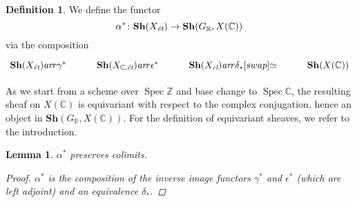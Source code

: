 \documentclass[leqno,12pt]{article}
\theoremstyle{plain}
\newtheorem{lemma}[theorem]{\indent\sc Lemma}
\theoremstyle{definition}
\newtheorem{definition}[theorem]{\indent\sc Definition}
\DeclareMathOperator{\Spec}{Spec}
\newcommand{\CC}{\mathbb{C}}
\newcommand{\RR}{\mathbb{R}}
\newcommand{\ZZ}{\mathbb{Z}}
\newcommand{\ar}{\text{\it ar}}
\newcommand{\et}{\text{\it \'{e}t}}
\begin{document}
\begin{definition}
  We define the functor
  $$\alpha^*\colon \mathbf{Sh} (X_\et) \to \mathbf{Sh} (G_\RR, X (\CC))$$
  via the composition
  \[ \begin{tikzcd}
      \mathbf{Sh} (X_\et) \ar{r}{\gamma^*} &
      \mathbf{Sh} (X_{\CC,\text{\it \'{e}t}}) \ar{r}{\epsilon^*} &
      \mathbf{Sh} (X_\text{\it cl}) \ar{r}{\delta_*}[swap]{\simeq} &
      \mathbf{Sh} (X (\CC))
    \end{tikzcd} \]
\end{definition}

As we start from a scheme over $\Spec \ZZ$ and base change to $\Spec \CC$, the
resulting sheaf on $X (\CC)$ is equivariant with respect to the complex
conjugation, hence an object in $\mathbf{Sh} (G_\RR, X (\CC))$. For the
definition of equivariant sheaves, we refer to the introduction.

\begin{lemma}
  \label{lemma:alpha-preserves-colimits}
  $\alpha^*$ preserves colimits.

  \begin{proof}
    $\alpha^*$ is the composition of the inverse image functors $\gamma^*$ and
    $\epsilon^*$ (which are left adjoint) and an equivalence $\delta_*$.
  \end{proof}
\end{lemma}
\end{document}
